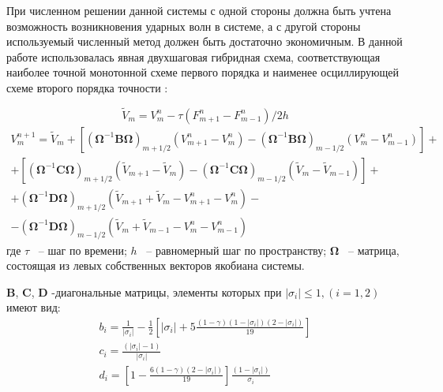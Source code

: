При численном решении данной системы с одной стороны должна быть учтена возможность возникновения ударных волн в системе, а с другой стороны используемый численный метод должен быть достаточно экономичным. В данной работе использовалась явная двухшаговая гибридная схема, соответствующая наиболее точной монотонной схеме первого порядка и наименее осциллирующей схеме второго порядка точности \cite{Magomedov1988}:

\begin{equation}
\tilde{V}_{m} =V_{m}^{n} -\tau \left(F_{m+1}^{n} -F_{m-1}^{n} \right)/2h
\end{equation} 
\begin{equation}
\begin{array}{l} 
{V_{m}^{n+1} =\tilde{V}_{m} +\left[\left(\mathbf{\Omega} ^{-1} \mathbf{B}\mathbf{\Omega} \right)_{m+1/2} \left(V_{m+1}^{n} -V_{m}^{n} \right)-\left(\mathbf{\Omega} ^{-1} \mathbf{B}\mathbf{\Omega} \right)_{m-1/2} \left(V_{m}^{n} -V_{m-1}^{n} \right)\right]+} \\ {+\left[\left(\mathbf{\Omega} ^{-1} \mathbf{C}\mathbf{\Omega} \right)_{m+1/2} \left(\tilde{V}_{m+1} -\tilde{V}_{m} \right)-\left(\mathbf{\Omega} ^{-1} \mathbf{C}\mathbf{\Omega} \right)_{m-1/2} \left(\tilde{V}_{m} -\tilde{V}_{m-1} \right)\right]+} \\ {+\left(\mathbf{\Omega} ^{-1} \mathbf{D}\mathbf{\Omega} \right)_{m+1/2} \left(\tilde{V}_{m+1} +\tilde{V}_{m} -V_{m+1}^{n} -V_{m}^{n} \right)-} \\ {-\left(\mathbf{\Omega} ^{-1} \mathbf{D}\mathbf{\Omega} \right)_{m-1/2} \left(\tilde{V}_{m} +\tilde{V}_{m-1} -V_{m}^{n} -V_{m-1}^{n} \right)} 
\end{array}
\end{equation}
где $\tau $ ~-- шаг по времени; $h $ ~-- равномерный шаг по пространству; $\mathbf{\Omega}$ ~-- матрица, состоящая из левых собственных векторов якобиана системы.

$ \mathbf{B}$, $\mathbf{C}$, $\mathbf{D}$ -диагональные матрицы, элементы которых при $\left|\sigma _{i} \right|\le 1,(i=1,2)$ имеют вид:
\begin{equation}
\begin{array}{l} \displaystyle {b_{i} =\frac{1}{\left|\sigma _{i} \right|} -\frac{1}{2} \left[\left|\sigma _{i} \right|+5\frac{\left(1-\gamma \right)\left(1-\left|\sigma _{i} \right|\right)\left(2-\left|\sigma _{i} \right|\right)}{19} \right]} \\ \displaystyle {c_{i} =\frac{\left(\left|\sigma _{i} \right|-1\right)}{\left|\sigma _{i} \right|} } \\ \displaystyle {d_{i} =\left[1-\frac{6\left(1-\gamma \right)\left(2-\left|\sigma _{i} \right|\right)}{19} \right]\frac{\left(1-\left|\sigma _{i} \right|\right)}{\sigma _{i} } } \end{array}
\end{equation}


